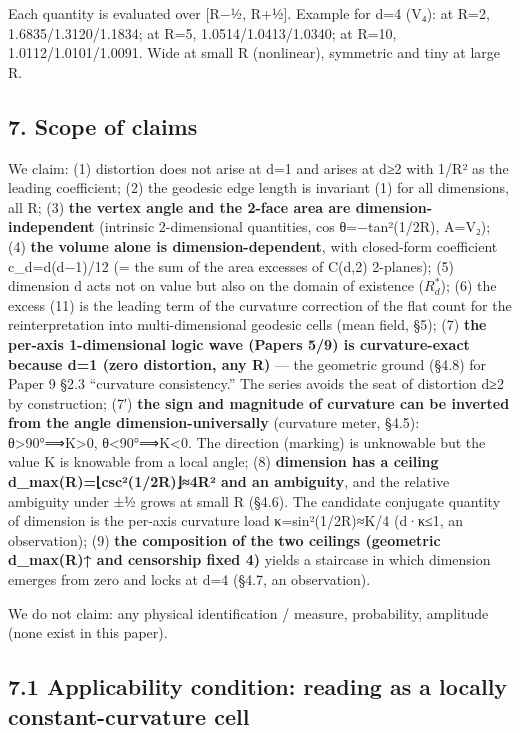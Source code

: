 \documentclass[
]{ltjsarticle}
\newcounter{none} %
\begin{document}
Each quantity is evaluated over {[}R−½, R+½{]}. Example for d=4 (V₄): at
R=2, 1.6835/1.3120/1.1834; at R=5, 1.0514/1.0413/1.0340; at R=10,
1.0112/1.0101/1.0091. Wide at small R (nonlinear), symmetric and tiny at
large R.

\subsection{7. Scope of claims}\label{scope-of-claims}

We claim: (1) distortion does not arise at d=1 and arises at d≥2 with
1/R² as the leading coefficient; (2) the geodesic edge length is
invariant (1) for all dimensions, all R; (3) \textbf{the vertex angle
and the 2-face area are dimension-independent} (intrinsic 2-dimensional
quantities, cos θ=−tan²(1/2R), A=V₂); (4) \textbf{the volume alone is
dimension-dependent}, with closed-form coefficient c\_d=d(d−1)/12 (= the
sum of the area excesses of C(d,2) 2-planes); (5) dimension d acts not
on value but also on the domain of existence (\(R^{*}_{d}\)); (6) the
excess (11) is the leading term of the curvature correction of the flat
count for the reinterpretation into multi-dimensional geodesic cells
(mean field, §5); (7) \textbf{the per-axis 1-dimensional logic wave
(Papers 5/9) is curvature-exact because d=1 (zero distortion, any R)}
--- the geometric ground (§4.8) for Paper 9 §2.3 ``curvature
consistency.'' The series avoids the seat of distortion d≥2 by
construction; (7′) \textbf{the sign and magnitude of curvature can be
inverted from the angle dimension-universally} (curvature meter, §4.5):
θ\textgreater90°⟹K\textgreater0, θ\textless90°⟹K\textless0. The
direction (marking) is unknowable but the value K is knowable from a
local angle; (8) \textbf{dimension has a ceiling
d\_max(R)=⌊csc²(1/2R)⌋≈4R² and an ambiguity}, and the relative ambiguity
under ±½ grows at small R (§4.6). The candidate conjugate quantity of
dimension is the per-axis curvature load κ=sin²(1/2R)≈K/4 (d·κ≤1, an
observation); (9) \textbf{the composition of the two ceilings (geometric
d\_max(R)↑ and censorship fixed 4)} yields a staircase in which
dimension emerges from zero and locks at d=4 (§4.7, an observation).

We do not claim: any physical identification / measure, probability,
amplitude (none exist in this paper).

\subsection{7.1 Applicability condition: reading as a locally
constant-curvature
cell}\label{applicability-condition-reading-as-a-locally-constant-curvature-cell}
\end{document}
